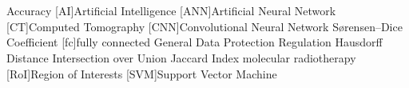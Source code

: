 \chapter*{\listacroname}
\begin{acronym}[XXXXX]
     { Accuracy}
    [AI]{Artificial Intelligence}
    [ANN]{Artificial Neural Network}
    [CT]{Computed Tomography}
    [CNN]{Convolutional Neural Network}
     {Sørensen–Dice Coefficient}
    [fc]{fully connected}
     {General Data Protection Regulation}
     {Hausdorff Distance}
     {Intersection over Union}
     {Jaccard Index}
     {molecular radiotherapy}
    [RoI]{Region of Interests}
    [SVM]{Support Vector Machine}
\end{acronym}
